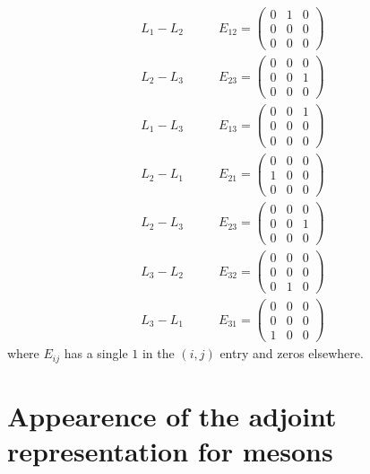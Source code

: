 \documentclass[12pt]{article}
\begin{document}
\begin{align*}
L_1 - L_2  & \quad \quad E_{12} = 
\begin{pmatrix}
0 & 1 & 0
\\
0 & 0 & 0
\\
0 & 0 & 0
\end{pmatrix}
\\
L_2 - L_3  & \quad \quad E_{23} = 
\begin{pmatrix}
0 & 0 & 0
\\
0 & 0 & 1
\\
0 & 0 & 0
\end{pmatrix}
\\
L_1 - L_3  & \quad \quad E_{13} = 
\begin{pmatrix}
0 & 0 & 1
\\
0 & 0 & 0
\\
0 & 0 & 0
\end{pmatrix}
\\
L_2 - L_1  & \quad \quad E_{21} = 
\begin{pmatrix}
0 & 0 & 0
\\
1 & 0 & 0
\\
0 & 0 & 0
\end{pmatrix}
\\
L_2 - L_3  & \quad \quad E_{23} = 
\begin{pmatrix}
0 & 0 & 0
\\
0 & 0 & 1
\\
0 & 0 & 0
\end{pmatrix}
\\
L_3 - L_2 & \quad \quad E_{32} = 
\begin{pmatrix}
0 & 0 & 0
\\
0 & 0 & 0
\\
0 & 1 & 0
\end{pmatrix}
\\
L_3 - L_1  & \quad \quad E_{31} = 
\begin{pmatrix}
0 & 0 & 0
\\
0 & 0 & 0
\\
1 & 0 & 0
\end{pmatrix}
\end{align*}
where $E_{ij}$ has a single $1$ in the $(i,j)$ entry and zeros elsewhere.

\section{Appearence of the adjoint representation for mesons}

\newcommand{\gl}{\mathfrak{gl}}
\newcommand{\inner}[2]{\left< #1 , #2 \right>}
\end{document}
